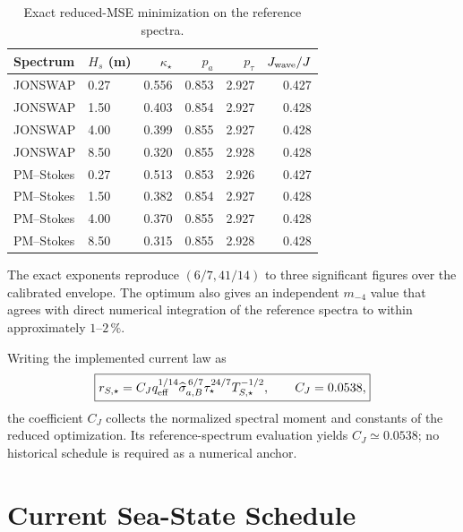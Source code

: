 \documentclass[conference]{IEEEtran}
\theoremstyle{remark}
\begin{document}
\begin{table}[t]
\centering
\caption{Exact reduced-MSE minimization on the reference spectra.}
\label{tab:exact-mse}
\footnotesize
\begin{tabular}{@{}llrrrr@{}}
\toprule
Spectrum & $H_s$ (m) & $\kappa_\star$ & $p_a$ & $p_\tau$ & $J_{\rm wave}/J$ \\
\midrule
JONSWAP    & 0.27 & 0.556 & 0.853 & 2.927 & 0.427 \\
JONSWAP    & 1.50 & 0.403 & 0.854 & 2.927 & 0.428 \\
JONSWAP    & 4.00 & 0.399 & 0.855 & 2.927 & 0.428 \\
JONSWAP    & 8.50 & 0.320 & 0.855 & 2.928 & 0.428 \\
PM--Stokes & 0.27 & 0.513 & 0.853 & 2.926 & 0.427 \\
PM--Stokes & 1.50 & 0.382 & 0.854 & 2.927 & 0.428 \\
PM--Stokes & 4.00 & 0.370 & 0.855 & 2.927 & 0.428 \\
PM--Stokes & 8.50 & 0.315 & 0.855 & 2.928 & 0.428 \\
\bottomrule
\end{tabular}
\end{table}

The exact exponents reproduce $(6/7,41/14)$ to three significant figures over
the calibrated envelope.  The optimum also gives an independent $m_{-4}$ value
that agrees with direct numerical integration of the reference spectra to
within approximately $1$--$2\,\%$.

Writing the implemented current law as
\begin{equation}
\boxed{
r_{S,\star}=C_J q_{\rm eff}^{1/14}
 \widehat\sigma_{a,B}^{\,6/7}
 \tau_\star^{24/7}T_{S,\star}^{-1/2},
 \qquad C_J=0.0538,}
\label{eq:deployed-spectral-mse}
\end{equation}
the coefficient $C_J$ collects the normalized spectral moment and constants of
the reduced optimization.  Its reference-spectrum evaluation yields
$C_J\simeq0.0538$; no historical schedule is required as a numerical anchor.

\section{Current Sea-State Schedule}
\label{sec:schedule}
\end{document}
